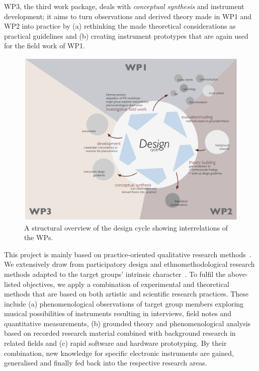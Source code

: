 \documentclass{chi-ext}
\begin{document}
\begin{multicols}{2}
WP3, the third work package, deals with \emph{conceptual synthesis} and instrument development; it aims to turn observations and derived theory made in WP1 and WP2 into practice by (a) rethinking the made theoretical considerations as practical guidelines and (b) creating instrument prototypes that are again used for the field work of WP1.

\begin{figure}
	\includegraphics[width=\columnwidth]{media/DEINDDesignCycle.pdf}
	\caption{A structural overview of the design cycle showing interrelations of the WPs.}
	\label{fig:Designcycle}
\end{figure}

This project is mainly based on practice-oriented qualitative research methods~\cite{travers2001-qua}.
We extensively draw from participatory design and ethnomethodological research methods adapted to the target groups’ intrinsic character~\cite{schuler1993-par,strauss1990-bas}.
To fulfil the above-listed objectives, we apply a combination of experimental and theoretical methods that are based on both artistic and scientific research practices. 
These include 
(a) phenomenological observations of target group members exploring musical possibilities of instruments resulting in interviews, field notes and quantitative measurements, 
(b) grounded theory and phenomenological analysis based on recorded research material combined with background research in related fields and
(c) rapid software and hardware prototyping.
By their combination, new knowledge for specific electronic instruments are gained, generalised and finally fed back into the respective research areas.


\end{multicols}
\end{document}
